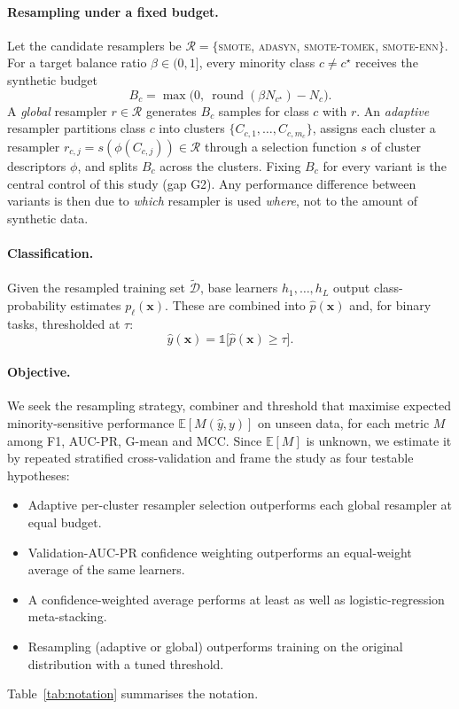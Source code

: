 \documentclass[11pt,a4paper]{article}
\begin{document}
\paragraph{Resampling under a fixed budget.} Let the candidate resamplers be $\mathcal{R}=\{$\textsc{smote}, \textsc{adasyn}, \textsc{smote-tomek}, \textsc{smote-enn}$\}$. For a target balance ratio $\beta\in(0,1]$, every minority class $c\neq c^\star$ receives the synthetic budget
\begin{equation}
B_c=\max\!\big(0,\ \operatorname{round}(\beta N_{c^\star})-N_c\big).\label{eq:budget}
\end{equation}
A \emph{global} resampler $r\in\mathcal{R}$ generates $B_c$ samples for class $c$ with $r$. An \emph{adaptive} resampler partitions class $c$ into clusters $\{C_{c,1},\dots,C_{c,m_c}\}$, assigns each cluster a resampler $r_{c,j}=s(\phi(C_{c,j}))\in\mathcal{R}$ through a selection function $s$ of cluster descriptors $\phi$, and splits $B_c$ across the clusters. Fixing $B_c$ for every variant is the central control of this study (gap G2). Any performance difference between variants is then due to \emph{which} resampler is used \emph{where}, not to the amount of synthetic data.

\paragraph{Classification.} Given the resampled training set $\tilde{\mathcal{D}}$, base learners $h_1,\dots,h_L$ output class-probability estimates $p_\ell(\mathbf{x})$. These are combined into $\hat p(\mathbf{x})$ and, for binary tasks, thresholded at $\tau$:
\begin{equation}
\hat y(\mathbf{x})=\mathbb{1}\big[\hat p(\mathbf{x})\ge\tau\big].\label{eq:decision}
\end{equation}

\paragraph{Objective.} We seek the resampling strategy, combiner and threshold that maximise expected minority-sensitive performance $\mathbb{E}[M(\hat y, y)]$ on unseen data, for each metric $M$ among F1, AUC-PR, G-mean and MCC. Since $\mathbb{E}[M]$ is unknown, we estimate it by repeated stratified cross-validation and frame the study as four testable hypotheses:
\begin{itemize}
  \item[\textbf{H1}] Adaptive per-cluster resampler selection outperforms each global resampler at equal budget.
  \item[\textbf{H2}] Validation-AUC-PR confidence weighting outperforms an equal-weight average of the same learners.
  \item[\textbf{H3}] A confidence-weighted average performs at least as well as logistic-regression meta-stacking.
  \item[\textbf{H4}] Resampling (adaptive or global) outperforms training on the original distribution with a tuned threshold.
\end{itemize}
Table~\ref{tab:notation} summarises the notation.
\end{document}
